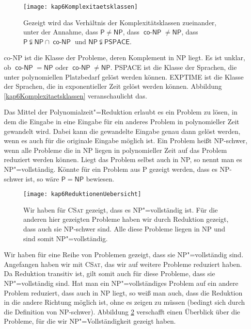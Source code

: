 \begin{figure}[htb]
  \centering
  \texttt{[image: kap6Komplexitaetsklassen]}
  \caption{Gezeigt wird das Verhältnis der Komplexitätsklassen zueinander, unter der Annahme, dass $\mathsf{P} \neq \mathsf{NP}$, dass $\operatorname{\mathsf{co-NP}} \neq \mathsf{NP}$, dass $\mathsf{P} \subsetneqq \mathsf{NP} \cap \operatorname{\mathsf{co-NP}}$ und $\mathsf{NP} \subsetneqq \mathsf{PSPACE}$.}
  \label{kap6Komplexitaetsklassen}
\end{figure}

\textsf{co-NP} ist die Klasse der Probleme, deren Komplement in \textsf{NP} liegt. Es ist unklar, ob $\operatorname{\mathsf{co-NP}} = \mathsf{NP}$ oder $\operatorname{\mathsf{co-NP}} \neq \mathsf{NP}$. \textsf{PSPACE} ist die Klasse der Sprachen, die unter polynomiellen Platzbedarf gelöst werden können. \textsf{EXPTIME} ist die Klasse der Sprachen, die in exponentieller Zeit gelöst werden können. Abbildung \vref{kap6Komplexitaetsklassen} veranschaulicht das.

Das Mittel der Polynomialzeit"=Reduktion erlaubt es ein Problem zu lösen, in dem die Eingabe in eine Eingabe für ein anderes Problem in polynomieller Zeit gewandelt wird. Dabei kann die gewandelte Eingabe genau dann gelöst werden, wenn es auch für die originale Eingabe möglich ist. Ein Problem heißt \textsf{NP}-schwer, wenn alle Probleme die in \textsf{NP} liegen in polynomieller Zeit auf das Problem reduziert werden können. Liegt das Problem selbst auch in \textsf{NP}, so nennt man es \textsf{NP}"=vollständig. Könnte für ein Problem aus \textsf{P} gezeigt werden, dass es \textsf{NP}-schwer ist, so wäre $\mathsf{P} = \mathsf{NP}$ bewiesen.

\begin{figure}[htb]
  \centering
  \texttt{[image: kap6ReduktionenUebersicht]}
  \caption{Wir haben für \textsc{CSat} gezeigt, dass es \textsf{NP}"=vollständig ist. Für die anderen hier gezeigten Probleme haben wir durch Reduktion gezeigt, dass auch sie \textsf{NP}-schwer sind. Alle diese Probleme liegen in \textsf{NP} und sind somit \textsf{NP}"=vollständig.}
  \label{kap6ReduktionenUebersicht}
\end{figure}

Wir haben für eine Reihe von Problemen gezeigt, dass sie \textsf{NP}"=vollständig sind. Angefangen haben wir mit \textsc{CSat}, das wir auf weitere Probleme reduziert haben. Da Reduktion transitiv ist, gilt somit auch für diese Probleme, dass sie \textsf{NP}"=vollständig sind. Hat man ein \textsf{NP}"=vollständiges Problem auf ein andere Problem reduziert, dass auch in \textsf{NP} liegt, so weiß man auch, dass die Reduktion in die andere Richtung möglich ist, ohne es zeigen zu müssen (bedingt sich durch die Definition von \textsf{NP}-schwer). Abbildung \ref{kap6ReduktionenUebersicht} verschafft einen Überblick über die Probleme, für die wir \textsf{NP}"=Vollständigkeit gezeigt haben.
